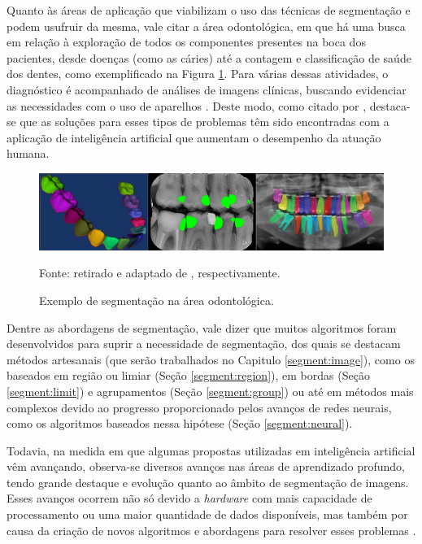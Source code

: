 Quanto às áreas de aplicação que viabilizam o uso das técnicas de segmentação e podem usufruir da mesma, vale citar a área odontológica, em que há uma busca em relação à exploração de todos os componentes presentes na boca dos pacientes, desde doenças (como as cáries) até a contagem e classificação de saúde dos dentes, como exemplificado na Figura \ref{intro:fig:4}. Para várias dessas atividades, o diagnóstico é acompanhado de análises de imagens clínicas, buscando evidenciar as necessidades com o uso de aparelhos \cite{Schwendicke2020}. Deste modo, como citado por \cite{Bansal2021, Nguyen2021,Schwendicke2020}, destaca-se que as soluções para esses tipos de problemas têm sido encontradas com a aplicação de inteligência artificial que aumentam o desempenho da atuação humana.

\begin{figure}[H]
    \centering
    \caption{Exemplo de segmentação na área odontológica.}
    \includegraphics[width=1\linewidth]{recursos/imagens/introduction/odonto_segmentation.png}
    \label{intro:fig:4}

    \vspace*{1 cm}
    Fonte: retirado e adaptado de \cite{Shuai2016,Bayrakdar2021,Gil2019}, respectivamente.
\end{figure}

Dentre as abordagens de segmentação, vale dizer que muitos algoritmos foram desenvolvidos para suprir a necessidade de segmentação, dos quais se destacam métodos artesanais (que serão trabalhados no Capitulo \ref{segment:image}), como os baseados em região ou limiar (Seção \ref{segment:region}), em bordas (Seção \ref{segment:limit}) e agrupamentos (Seção \ref{segment:group}) ou até em métodos mais complexos devido ao progresso proporcionado pelos avanços de redes neurais, como os algoritmos baseados nessa hipótese (Seção \ref{segment:neural}).

Todavia, na medida em que algumas propostas utilizadas em inteligência artificial vêm avançando, observa-se diversos avanços nas áreas de aprendizado profundo, tendo grande destaque e evolução quanto ao âmbito de segmentação de imagens. Esses avanços ocorrem não só devido a \textit{hardware} com mais capacidade de processamento ou uma maior quantidade de dados disponíveis, mas também por causa da criação de novos algoritmos e abordagens para resolver esses problemas \cite{Szegedy2015}.

